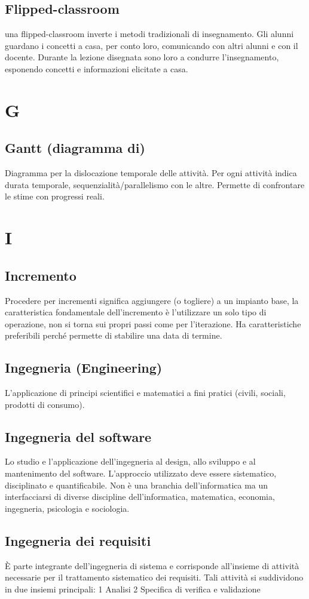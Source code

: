 \documentclass[a4paper]{report}
\newcommand{\mychapter}[2]{
	\setcounter{chapter}{#1}
	\setcounter{section}{0}
	\setcounter{subsection}{1}
	\chapter*{#2}
	\addcontentsline{toc}{chapter}{#2}
}
\begin{document}
\section{Flipped-classroom} una flipped-classroom inverte i metodi tradizionali di insegnamento. Gli alunni guardano i concetti a casa, per conto loro, comunicando con altri alunni e con il docente. Durante la lezione disegnata sono loro a condurre l'insegnamento, esponendo concetti e informazioni elicitate a casa.

\mychapter{7}{G}

\section{Gantt (diagramma di)} Diagramma per la dislocazione temporale delle attività. Per ogni attività indica durata temporale, sequenzialità/parallelismo con le altre. Permette di confrontare le stime con progressi reali.

\mychapter{8}{I}

\section{Incremento} Procedere per incrementi significa aggiungere (o togliere) a un impianto base, la caratteristica fondamentale dell’incremento è l’utilizzare un solo tipo di operazione, non si torna sui propri passi come per l’iterazione. Ha caratteristiche preferibili perché permette di stabilire una data di termine.
\section{Ingegneria (Engineering)} L’applicazione di principi scientifici e matematici a fini pratici (civili, sociali, prodotti di consumo).
\section{Ingegneria del software} Lo studio e l’applicazione dell’ingegneria al design, allo sviluppo e al mantenimento del software. L’approccio utilizzato deve essere sistematico, disciplinato e quantificabile. Non è una branchia dell’informatica ma un interfacciarsi di diverse discipline dell’informatica, matematica, economia, ingegneria, psicologia e sociologia.
\section{Ingegneria dei requisiti} È parte integrante dell’ingegneria di sistema e corrisponde all’insieme di attività necessarie per il trattamento sistematico dei requisiti. Tali attività si suddividono in due insiemi principali:
  1 Analisi
  2 Specifica di verifica e validazione
\end{document}
